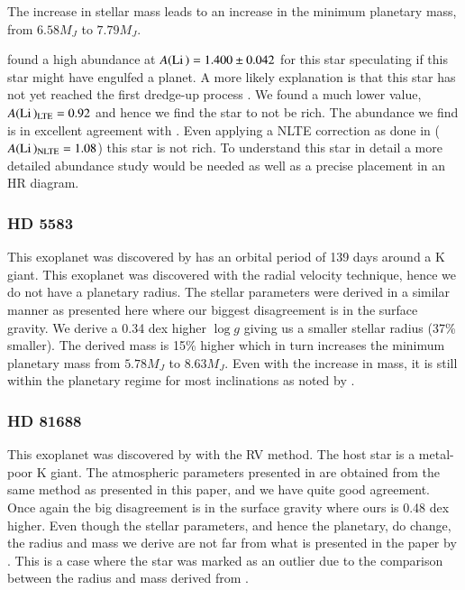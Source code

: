 \documentclass{aa}
\begin{document}
The increase in stellar mass leads to an increase in the minimum planetary mass,
from $6.58M_J$ to $7.79M_J$.

\citet{Nowak2013} found a high  abundance at
$A(\ion{Li}{})=1.400\pm0.042$ for this star speculating if this star might have
engulfed a planet. A more likely explanation is that this star has not yet
reached the first dredge-up process \citep{Nowak2013}. We found a much lower
value, $A(\ion{Li}{})_\mathrm{LTE}=0.92$ and hence we find the star to not be
 rich. The  abundance we find is in excellent agreement with
\citet{Adamow2014}. Even applying a NLTE correction as done in
\citet{Adamow2014} ($A(\ion{Li}{})_\mathrm{NLTE}=1.08$) this star is not
 rich. To understand this star in detail a more detailed abundance
study would be needed as well as a precise placement in an HR diagram.

\subsubsection{HD 5583}
\label{sub:HD_5583}
This exoplanet was discovered by \citet{Niedzielski2016} has an orbital period
of 139 days around a K giant. This exoplanet was discovered with the radial
velocity technique, hence we do not have a planetary radius. The stellar
parameters were derived in a similar manner as presented here
\citep[see][and references therein]{Niedzielski2016} where our biggest
disagreement is in the surface gravity. We derive a 0.34 dex higher $\log g$
giving us a smaller stellar radius (37\% smaller). The derived mass is 15\%
higher which in turn increases the minimum planetary mass from $5.78M_J$ to
$8.63M_J$. Even with the increase in mass, it is still within the planetary
regime for most inclinations as noted by \citet{Niedzielski2016}.



\subsubsection{HD 81688}
\label{sub:HD81688}
This exoplanet was discovered by \citet{Sato2008} with the RV method. The host
star is a metal-poor K giant. The atmospheric parameters presented in
\citet{Sato2008} are obtained from the same method as presented in this paper,
and we have quite good agreement. Once again the big disagreement is in the
surface gravity where ours is 0.48 dex higher. Even though the stellar
parameters, and hence the planetary, do change, the radius and mass we derive
are not far from what is presented in the paper by \citet{Sato2008}. This is a
case where the star was marked as an outlier due to the comparison between the
radius and mass derived from \citet{Torres2010}.
\end{document}
